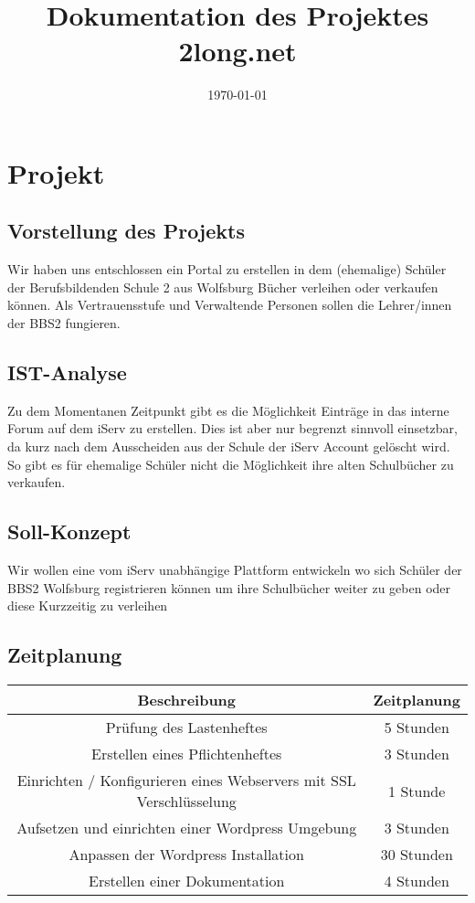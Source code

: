 \documentclass[a4paper, DIV20, 11pt, headsepline, parskip]{article}
\title{Dokumentation des Projektes 2long.net}
\author{\uauthor}
\newcommand{\udate}{\today}
\begin{document}
\date{\udate}
\maketitle
\thispagestyle{empty}
\newpage
\setcounter{page}{1}
\tableofcontents
\pagebreak
\section{Projekt}

\subsection{Vorstellung des Projekts}
Wir haben uns entschlossen ein Portal zu erstellen in dem (ehemalige) Schüler der Berufsbildenden Schule 2 aus Wolfsburg Bücher verleihen oder verkaufen können.
Als Vertrauensstufe und Verwaltende Personen sollen die Lehrer/innen der BBS2 fungieren. 
\subsection{IST-Analyse}
Zu dem Momentanen Zeitpunkt gibt es die Möglichkeit Einträge in das interne Forum auf dem iServ zu erstellen.
Dies ist aber nur begrenzt sinnvoll einsetzbar, da kurz nach dem Ausscheiden aus der Schule der iServ Account gelöscht wird.
So gibt es für ehemalige Schüler nicht die Möglichkeit ihre alten Schulbücher zu verkaufen.
\subsection{Soll-Konzept}
Wir wollen eine vom iServ unabhängige Plattform entwickeln wo sich Schüler der BBS2 Wolfsburg registrieren können um ihre Schulbücher weiter zu geben oder diese Kurzzeitig zu verleihen
\subsection{Zeitplanung}
\begin{tabular}{cc}
 Beschreibung & Zeitplanung\\
 \hline
 Prüfung des Lastenheftes & 5 Stunden\\
 Erstellen eines Pflichtenheftes & 3 Stunden\\
 Einrichten / Konfigurieren eines Webservers mit SSL Verschlüsselung & 1 Stunde\\
 Aufsetzen und einrichten einer Wordpress Umgebung & 3 Stunden\\
 Anpassen der Wordpress Installation & 30 Stunden\\
 Erstellen einer Dokumentation & 4 Stunden\\
\end{tabular}
\end{document}
